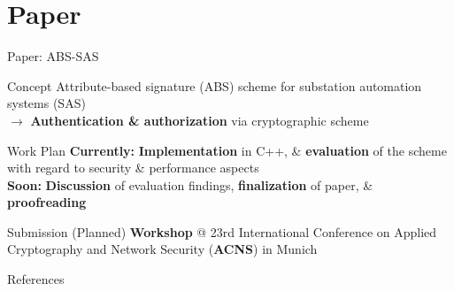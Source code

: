 \documentclass[en]{sdqbeamer}
\begin{document}
\section{Paper}
\begin{frame}{Paper: ABS-SAS}
    \begin{greenblock}{Concept}
        Attribute-based signature (ABS) scheme for substation automation systems (SAS)
        \\$\rightarrow$ \textbf{Authentication \& authorization} via cryptographic scheme
    \end{greenblock}
    \begin{blueblock}{Work Plan}
        \textbf{Currently:} \textbf{Implementation} in C++, \& \textbf{evaluation} of the scheme with regard to security \& performance aspects\\
        \textbf{Soon:} \textbf{Discussion} of evaluation findings, \textbf{finalization} of paper, \& \textbf{proofreading}
    \end{blueblock}
    \begin{grayblock}{Submission (Planned)}
        \textbf{Workshop} @ 23rd International Conference on Applied Cryptography and Network Security (\textbf{ACNS}) in Munich
    \end{grayblock}
\end{frame}

\begin{frame}[allowframebreaks]{References}
\printbibliography
\end{frame}

\backupend
\end{document}
